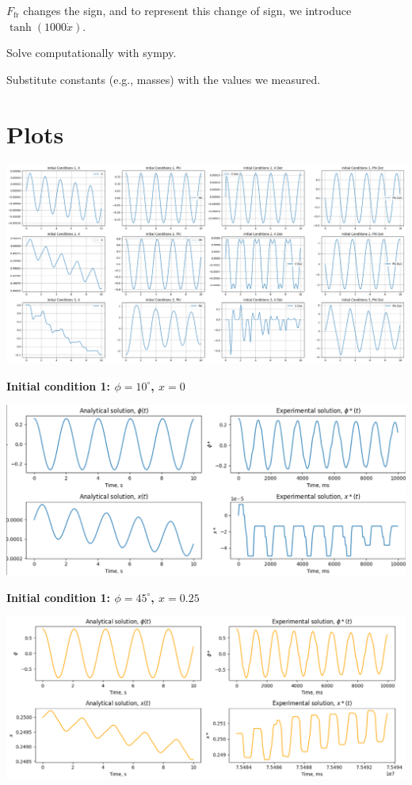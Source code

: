 \documentclass{article}
\begin{document}
$F_\text{fr}$ changes the sign, and to represent this change of sign, we introduce $\tanh(1000 \dot{x})$.

Solve computationally with sympy.

Substitute constants (e.g., masses) with the values we measured.

\section{Plots}
\includegraphics*[scale=0.25]{graphics/results.png}

\textbf{Initial condition 1: $\phi = 10^\circ$, $x = 0$}

\includegraphics*[scale=0.25]{graphics/res_comparison_init1.png}


\textbf{Initial condition 1: $\phi = 45^\circ$, $x = 0.25$}

\includegraphics*[scale=0.25]{graphics/res_comparison_init2.png}
\end{document}
